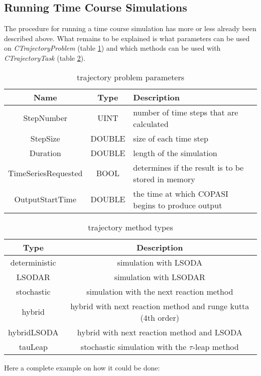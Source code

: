 \documentclass[a4,10pt]{article}
\begin{document}
\subsection{Running Time Course Simulations}
The procedure for running a time course simulation has more or less already been described above. 
What remains to be explained is what parameters can be used on \textit{CTrajectoryProblem} (table \ref{TrajectoryProblemParameters}) and which methods can be used with \textit{CTrajectoryTask} (table \ref{TrajectoryMethods}).

\small{
\begin{table}[ht]
\begin{tabular}{c|c|l}
Name & Type & Description \\ \hline \hline
StepNumber & UINT & number of time steps that are calculated \\ \hline
StepSize & DOUBLE & size of each time step \\ \hline
Duration & DOUBLE & length of the simulation \\ \hline
TimeSeriesRequested & BOOL & determines if the result is to be stored in memory \\ \hline
OutputStartTime & DOUBLE & the time at which COPASI begins to produce output \\ \hline
\end{tabular}
\label{TrajectoryProblemParameters}
\caption{trajectory problem parameters}
\end{table}
}
\begin{table}[ht]
\begin{tabular}{c|c}
Type &  Description \\ \hline \hline
deterministic  & simulation with LSODA \\ \hline
LSODAR  &  simulation with LSODAR \\ \hline
stochastic &  simulation with the next reaction method \\ \hline
hybrid &  hybrid with next reaction method and runge kutta (4th order)\\ \hline
hybridLSODA & hybrid with next reaction method and LSODA \\ \hline
tauLeap & stochastic simulation with the $\tau$-leap method \\ \hline
\end{tabular}
\label{TrajectoryMethods}
\caption{trajectory method types}
\end{table}

Here a complete example on how it could be done:
\end{document}
